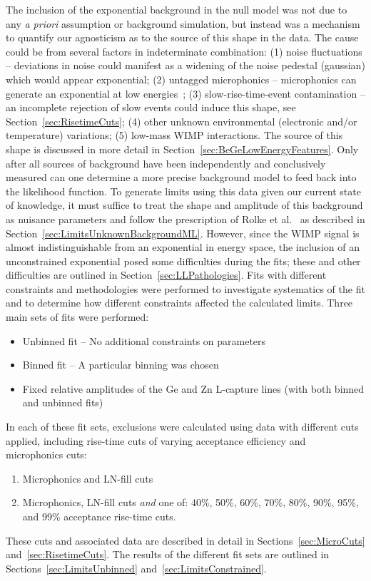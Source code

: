 The inclusion of the exponential background in the null model was not due to any \emph{a priori} assumption or background simulation, but instead was a mechanism to quantify our agnosticism as to the source of 
this shape in %
the data.  The cause could be from several factors in indeterminate combination: (1) noise fluctuations -- deviations in noise could manifest as a widening of the noise pedestal (gaussian) which would appear exponential; (2) untagged microphonics -- microphonics can generate an exponential at low energies~\cite{Morales1992410}; (3) slow-rise-time-event contamination -- an incomplete rejection of slow events could induce this shape, see Section~\ref{sec:RisetimeCuts}; (4) other unknown environmental (electronic and/or temperature) variations; (5) low-mass WIMP interactions.  The source of this shape is discussed in more detail in Section~\ref{sec:BeGeLowEnergyFeatures}.  Only after all sources of background have been independently and conclusively measured can one determine a more precise background model to feed back into the likelihood function.  To generate limits using this data given our current state of knowledge, it must suffice to treat the shape and amplitude of this background as nuisance parameters and follow the prescription of Rolke et al.~\cite{Rol05} as described in Section~\ref{sec:LimitsUnknownBackgroundML}.  However, since the WIMP signal is almost indistinguishable from an exponential in energy space, the inclusion of an unconstrained exponential posed some difficulties during the fits; these and other difficulties are outlined in Section~\ref{sec:LLPathologies}.
Fits with different constraints and methodologies were performed to investigate systematics of the fit and to determine how different constraints affected the calculated limits.  Three main sets of fits were performed:
		\begin{itemize}
			\item Unbinned fit -- No additional constraints on parameters
			\item Binned fit -- A particular binning was chosen
			\item Fixed relative amplitudes of the Ge and Zn L-capture lines (with both binned and unbinned fits)
		\end{itemize}			
In each of these fit sets, exclusions were calculated using data with different cuts applied, including rise-time cuts of varying acceptance efficiency and microphonics cuts:
	\begin{enumerate}	
		\item Microphonics and LN-fill cuts
		\item Microphonics, LN-fill cuts \emph{and} one of: 40\%, 50\%, 60\%, 70\%, 80\%, 90\%, 95\%, and 99\%
		acceptance rise-time cuts.
	\end{enumerate}
These cuts and associated data are described in detail in Sections~\ref{sec:MicroCuts} and~\ref{sec:RisetimeCuts}.  The results of the different fit sets are outlined in Sections~\ref{sec:LimitsUnbinned} and~\ref{sec:LimitsConstrained}.  

